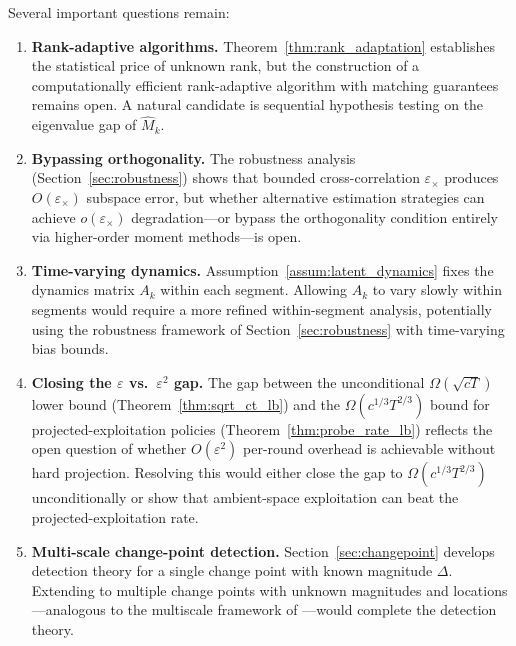 \documentclass[12pt]{article}
\theoremstyle{plain}
\theoremstyle{definition}
\begin{document}
Several important questions remain:
\begin{enumerate}[leftmargin=1.5em]
\item \textbf{Rank-adaptive algorithms.} Theorem~\ref{thm:rank_adaptation} establishes the statistical price of unknown rank, but the construction of a computationally efficient rank-adaptive algorithm with matching guarantees remains open. A natural candidate is sequential hypothesis testing on the eigenvalue gap of $\widehat{M}_k$.

\item \textbf{Bypassing orthogonality.} The robustness analysis (Section~\ref{sec:robustness}) shows that bounded cross-correlation $\varepsilon_\times$ produces $O(\varepsilon_\times)$ subspace error, but whether alternative estimation strategies can achieve $o(\varepsilon_\times)$ degradation---or bypass the orthogonality condition entirely via higher-order moment methods---is open.

\item \textbf{Time-varying dynamics.} Assumption~\ref{assum:latent_dynamics} fixes the dynamics matrix $A_k$ within each segment. Allowing $A_k$ to vary slowly within segments would require a more refined within-segment analysis, potentially using the robustness framework of Section~\ref{sec:robustness} with time-varying bias bounds.

\item \textbf{Closing the $\varepsilon$ vs.\ $\varepsilon^2$ gap.} The gap between the unconditional $\Omega(\sqrt{cT})$ lower bound (Theorem~\ref{thm:sqrt_ct_lb}) and the $\Omega(c^{1/3}T^{2/3})$ bound for projected-exploitation policies (Theorem~\ref{thm:probe_rate_lb}) reflects the open question of whether $O(\varepsilon^2)$ per-round overhead is achievable without hard projection. Resolving this would either close the gap to $\Omega(c^{1/3}T^{2/3})$ unconditionally or show that ambient-space exploitation can beat the projected-exploitation rate.

\item \textbf{Multi-scale change-point detection.} Section~\ref{sec:changepoint} develops detection theory for a single change point with known magnitude $\Delta$. Extending to multiple change points with unknown magnitudes and locations---analogous to the multiscale framework of \citet{wang2018high}---would complete the detection theory.
\end{enumerate}
\end{document}
